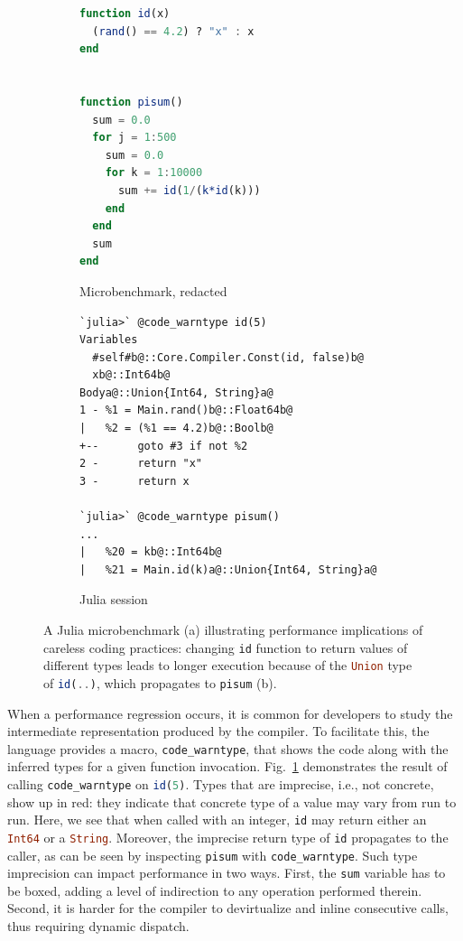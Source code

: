 \documentclass[oneside,openright,titlepage,numbers=noenddot,%
headinclude,footinclude,cleardoublepage=empty,abstract=on,
BCOR=5mm,paper=a4,fontsize=11pt,
dvipsnames
]{scrreprt}
\renewcommand{\c}[1]{\lstinline[language=Julia]!#1!\xspace}
\begin{document}
\begin{figure}[h!]
\centering
\begin{subfigure}[b]{0.49\textwidth}
\centering
\begin{lstlisting}[language=julia,style=jterm]
function id(x)
  (rand() == 4.2) ? "x" : x
end


function pisum()
  sum = 0.0
  for j = 1:500
    sum = 0.0
    for k = 1:10000
      sum += id(1/(k*id(k)))
    end
  end
  sum
end
\end{lstlisting}
\caption{Microbenchmark, redacted}
\end{subfigure}
%
\begin{subfigure}[b]{0.48\textwidth}
\begin{lstlisting}[style=jterm]
`julia>` @code_warntype id(5)
Variables
  #self#b@::Core.Compiler.Const(id, false)b@
  xb@::Int64b@
Bodya@::Union{Int64, String}a@
1 - %1 = Main.rand()b@::Float64b@
|   %2 = (%1 == 4.2)b@::Boolb@
+--      goto #3 if not %2
2 -      return "x"
3 -      return x

`julia>` @code_warntype pisum()
...
|   %20 = kb@::Int64b@
|   %21 = Main.id(k)a@::Union{Int64, String}a@
\end{lstlisting}
\caption{Julia session}
%
\end{subfigure}
\caption{A Julia microbenchmark (a) illustrating performance implications
  of careless coding practices: changing \c{id} function to return
  values of different types leads to longer execution
  because of the \c{Union} type of \c{id(..)}, which propagates to \c{pisum} (b).}%
\label{ide}
\end{figure}

When a performance regression occurs, it is common for developers to study the
intermediate representation produced by the compiler. To facilitate this, the
language provides a macro, \c{code_warntype}, that shows the code along with the
inferred types for a given function invocation. Fig.~\ref{ide} demonstrates the result of
calling \c{code_warntype} on \c{id(5)}. Types that are imprecise, i.e., not
concrete, show up in red: they indicate that concrete type of a value may vary
from run to run. Here, we see that when called with an integer,
\c{id} may return either an
\c{Int64} or a \c{String}.
Moreover, the imprecise return type of \c{id} propagates to the caller,
as can be seen by inspecting \c{pisum} with \c{code_warntype}.
%
Such type imprecision can impact performance in two ways. First,
the \c{sum} variable has to be boxed, adding a level of indirection to
any operation performed therein. Second, it is harder for
the compiler to devirtualize and inline consecutive calls, thus requiring
dynamic dispatch.
\end{document}
